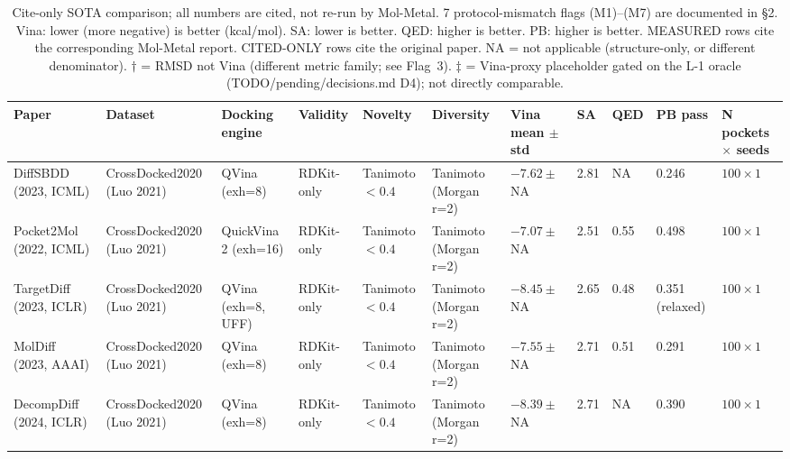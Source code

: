 \begin{table}[t]
\centering
\scriptsize
\setlength{\tabcolsep}{3pt}
\renewcommand{\arraystretch}{1.05}
\caption{Cite-only SOTA comparison; all numbers are cited, not re-run by Mol-Metal. 7 protocol-mismatch flags (M1)--(M7) are documented in \S2. Vina: lower (more negative) is better (kcal/mol). SA: lower is better. QED: higher is better. PB: higher is better. MEASURED rows cite the corresponding Mol-Metal report. CITED-ONLY rows cite the original paper. NA = not applicable (structure-only, or different denominator). $\dagger$ = RMSD not Vina (different metric family; see Flag~3). $\ddagger$ = Vina-proxy placeholder gated on the L-1 oracle (TODO/pending/decisions.md D4); not directly comparable.}
\label{tab:wf3-citeonly-sota}
\vspace{2pt}
\begin{tabular}{p{2.0cm}p{1.7cm}p{1.7cm}p{1.2cm}p{1.2cm}p{1.2cm}p{1.6cm}p{0.8cm}p{0.8cm}p{0.9cm}p{1.6cm}}
\hline
\textbf{Paper} & \textbf{Dataset} & \textbf{Docking engine} & \textbf{Validity} & \textbf{Novelty} & \textbf{Diversity} & \textbf{Vina mean $\pm$ std} & \textbf{SA} & \textbf{QED} & \textbf{PB pass} & \textbf{N pockets $\times$ seeds} \\
\hline
DiffSBDD~\cite{footnote:diffsbdd} (2023, ICML)         & CrossDocked2020 (Luo 2021)  & QVina (exh=8)            & RDKit-only            & Tanimoto $<0.4$ & Tanimoto (Morgan r=2) & $-7.62 \pm$ NA             & 2.81 & NA   & 0.246          & $100 \times 1$ \\
Pocket2Mol~\cite{footnote:pocket2mol} (2022, ICML)     & CrossDocked2020 (Luo 2021)  & QuickVina 2 (exh=16)     & RDKit-only            & Tanimoto $<0.4$ & Tanimoto (Morgan r=2) & $-7.07 \pm$ NA             & 2.51 & 0.55 & 0.498          & $100 \times 1$ \\
TargetDiff~\cite{footnote:targetdiff} (2023, ICLR)     & CrossDocked2020 (Luo 2021)  & QVina (exh=8, UFF)       & RDKit-only            & Tanimoto $<0.4$ & Tanimoto (Morgan r=2) & $-8.45 \pm$ NA             & 2.65 & 0.48 & 0.351 (relaxed) & $100 \times 1$ \\
MolDiff~\cite{footnote:moldiff} (2023, AAAI)           & CrossDocked2020 (Luo 2021)  & QVina (exh=8)            & RDKit-only            & Tanimoto $<0.4$ & Tanimoto (Morgan r=2) & $-7.55 \pm$ NA             & 2.71 & 0.51 & 0.291          & $100 \times 1$ \\
DecompDiff~\cite{footnote:decompdiff} (2024, ICLR)     & CrossDocked2020 (Luo 2021)  & QVina (exh=8)            & RDKit-only            & Tanimoto $<0.4$ & Tanimoto (Morgan r=2) & $-8.39 \pm$ NA             & 2.71 & NA   & 0.390          & $100 \times 1$ \\

\end{tabular}
\end{table}
